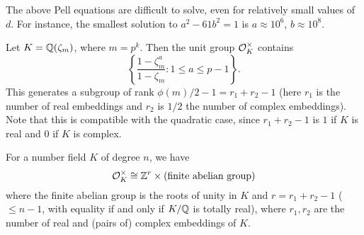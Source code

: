 \begin{remark}
  The above Pell equations are difficult to solve, even for
  relatively small values of $d$. For instance, the
  smallest solution to $a^2 - 61 b^2 = 1$ is
  $a \approx 10^6$, $b \approx 10^8$.
\end{remark}

\begin{example}
  Let $K = \mathbb{Q}(\zeta_m)$, where $m = p^k$. Then the unit group
  $\mathcal{O}_K^\times$ contains
  \[
    \left\{
      \frac{1 - \zeta_m^a}{1 - \zeta_m} : 1 \le a \le p - 1
    \right\}.
  \]
  This generates a subgroup of rank $\phi(m) / 2 - 1 = r_1 + r_2 - 1$ (here $r_1$ is the number of real embeddings
  and $r_2$ is $1 / 2$ the number of complex embeddings).
  Note that this is compatible with the quadratic case,
  since $r_1 + r_2 - 1$ is $1$ if $K$ is real and $0$ if $K$
  is complex.
\end{example}

\begin{theorem}
  For a number field $K$ of degree $n$, we have
  \[
    \mathcal{O}_K^\times \cong \mathbb{Z}^{r} \times (\text{finite abelian group})
  \]
  where the finite abelian group is the roots of unity in $K$
  and $r = r_1 + r_2 - 1$ ($\le n - 1$, with equality if and
  only if $K / \mathbb{Q}$ is totally real), where $r_1, r_2$
  are the number of real and (pairs of) complex embeddings
  of $K$.
\end{theorem}
